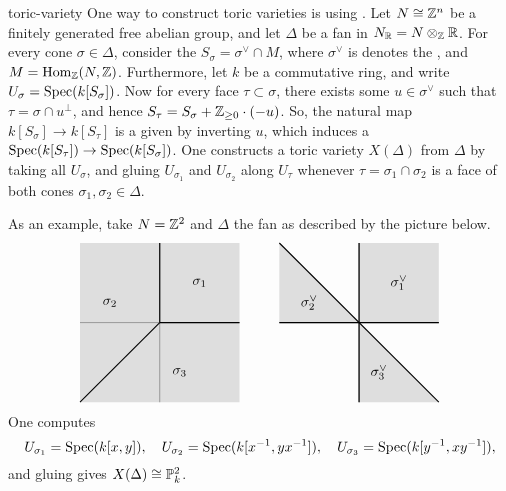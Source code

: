 \begin{example}{toric-variety}
    One way to construct toric varieties is using . Let $N \cong \mathbb{Z}^n$ be a finitely generated free abelian group, and let $\Delta$ be a fan in $N_{\mathbb{R}} = N \otimes_{\mathbb{Z}} \mathbb{R}$. For every cone $\sigma \in \Delta$, consider the  $S_\sigma = \sigma^\vee \cap M$, where $\sigma^\vee$ is denotes the , and $M = \operatorname{Hom}_{\mathbb{Z}}(N, \mathbb{Z})$. Furthermore, let $k$ be a commutative ring, and write $U_\sigma = \operatorname{Spec}(k[S_\sigma])$.
    Now for every face $\tau \subset \sigma$, there exists some $u \in \sigma^\vee$ such that $\tau = \sigma \cap u^\perp$, and hence $S_\tau = S_\sigma + \mathbb{Z}_{\ge 0} \cdot (-u)$. So, the natural map $k[S_\sigma] \to k[S_\tau]$ is a  given by inverting $u$, which induces a  $\operatorname{Spec}(k[S_\tau]) \to \operatorname{Spec}(k[S_\sigma])$.
    One constructs a toric variety $X(\Delta)$ from $\Delta$ by taking all $U_\sigma$, and gluing $U_{\sigma_1}$ and $U_{\sigma_2}$ along $U_\tau$ whenever $\tau = \sigma_1 \cap \sigma_2$ is a face of both cones $\sigma_1, \sigma_2 \in \Delta$.
    
    As an example, take $N = \mathbb{Z}^2$ and $\Delta$ the fan as described by the picture below.
    \[ \begin{tikzpicture}
        \begin{scope}
            \draw (-2, 0) -- (2, 0);
            \draw (0, -2) -- (0, 2);
            \fill[fill=gray!50, opacity=0.5] (-2, -2) -- (2, -2) -- (2, 2) -- (-2, 2);
            \draw[thick] (0, 0) -- (2, 0);
            \draw[thick] (0, 0) -- (0, 2);
            \draw[thick] (0, 0) -- (-2, -2);
            \node at (1, 1) {$\sigma_1$};
            \node at (-1.25, 0.5) {$\sigma_2$};
            \node at (0.5, -1.25) {$\sigma_3$};
        \end{scope}
        \begin{scope}[shift={(5, 0)}]
            \draw (-2, 0) -- (2, 0);
            \draw (0, -2) -- (0, 2);
            \fill[fill=gray!50, opacity=0.5] (0, 0) -- (2, 0) -- (2, 2) -- (0, 2);
            \fill[fill=gray!50, opacity=0.5] (0, 0) -- (-2, 0) -- (-2, 2);
            \fill[fill=gray!50, opacity=0.5] (0, 0) -- (0, -2) -- (2, -2);
            \draw[thick] (-2, 0) -- (2, 0);
            \draw[thick] (0, -2) -- (0, 2);
            \draw[thick] (-2, 2) -- (2, -2);
            \node at (1, 1) {$\sigma_1^\vee$};
            \node at (-1.25, 0.5) {$\sigma_2^\vee$};
            \node at (0.5, -1.25) {$\sigma_3^\vee$};
        \end{scope}
    \end{tikzpicture} \]
    One computes
    \[ U_{\sigma_1} = \operatorname{Spec}(k[x, y]), \quad U_{\sigma_2} = \operatorname{Spec}(k[x^{-1}, yx^{-1}]), \quad U_{\sigma_3} = \operatorname{Spec}(k[y^{-1}, xy^{-1}]) , \]
    and gluing gives $X(\Delta) \cong \mathbb{P}_k^2$.


\end{example}
